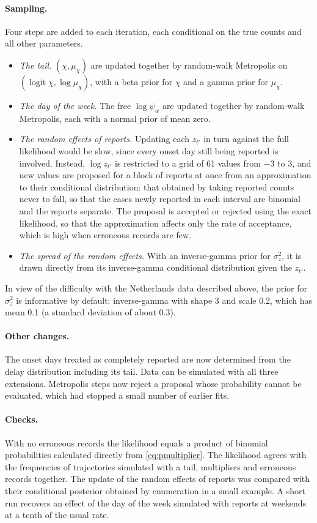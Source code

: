 \documentclass[11pt,a4paper]{article}
\begin{document}
\paragraph{Sampling.} Four steps are added to each iteration, each conditional
on the true counts and all other parameters.
\begin{itemize}[itemsep=2pt]
\item \emph{The tail.} $(\chi,\mu_\chi)$ are updated together by random-walk
Metropolis on $(\operatorname{logit}\chi,\log\mu_\chi)$, with a beta prior for
$\chi$ and a gamma prior for $\mu_\chi$.
\item \emph{The day of the week.} The free $\log\psi_w$ are updated together by
random-walk Metropolis, each with a normal prior of mean zero.
\item \emph{The random effects of reports.} Updating each $z_{t'}$ in turn
against the full likelihood would be slow, since every onset day still being
reported is involved. Instead, $\log z_{t'}$ is restricted to a grid of 61
values from $-3$ to $3$, and new values are proposed for a block of reports at
once from an approximation to their conditional distribution: that obtained by
taking reported counts never to fall, so that the cases newly reported in each
interval are binomial and the reports separate. The proposal is accepted or
rejected using the exact likelihood, so that the approximation affects only
the rate of acceptance, which is high when erroneous records are few.
\item \emph{The spread of the random effects.} With an inverse-gamma prior for
$\sigma_z^2$, it is drawn directly from its inverse-gamma conditional
distribution given the $z_{t'}$.
\end{itemize}
In view of the difficulty with the Netherlands data described above, the prior
for $\sigma_z^2$ is informative by default: inverse-gamma with shape 3 and
scale 0.2, which has mean 0.1 (a standard deviation of about 0.3).

\paragraph{Other changes.} The onset days treated as completely reported are
now determined from the delay distribution including its tail. Data can be
simulated with all three extensions. Metropolis steps now reject a proposal
whose probability cannot be evaluated, which had stopped a small number of
earlier fits.

\paragraph{Checks.} With no erroneous records the likelihood equals a product
of binomial probabilities calculated directly from \eqref{eq:pmultiplier}. The
likelihood agrees with the frequencies of trajectories simulated with a tail,
multipliers and erroneous records together. The update of the random effects of
reports was compared with their conditional posterior obtained by enumeration
in a small example. A short run recovers an effect of the day of the week
simulated with reports at weekends at a tenth of the usual rate.
\end{document}
